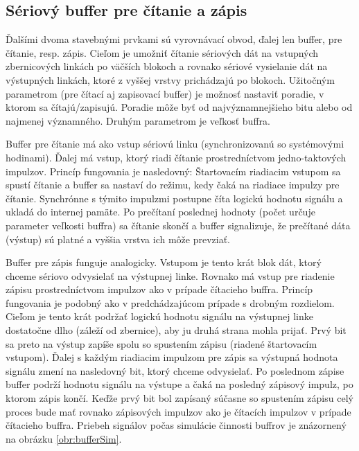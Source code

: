 \subsection{Sériový buffer pre čítanie a zápis}
Ďalšími dvoma stavebnými prvkami sú vyrovnávací obvod, ďalej len buffer, pre čítanie, resp. zápis. Cieľom je umožniť čítanie sériových dát na vstupných zbernicových linkách po väčších blokoch a rovnako sériové vysielanie dát na výstupných linkách, ktoré z vyššej vrstvy prichádzajú po blokoch. Užitočným parametrom (pre čítací aj zapisovací buffer) je možnosť nastaviť poradie, v ktorom sa čítajú/zapisujú. Poradie môže byť od najvýznamnejšieho bitu alebo od najmenej významného. Druhým parametrom je veľkosť buffra.

Buffer pre čítanie má ako vstup sériovú linku (synchronizovanú so systémovými hodinami). Ďalej má vstup, ktorý riadi čítanie prostredníctvom jedno-taktových impulzov. Princíp fungovania je nasledovný: Štartovacím riadiacim vstupom sa spustí čítanie a buffer sa nastaví do režimu, kedy čaká na riadiace impulzy pre čítanie. Synchrónne s týmito impulzmi postupne číta logickú hodnotu signálu a ukladá do internej pamäte. Po prečítaní poslednej hodnoty (počet určuje parameter veľkosti buffra) sa čítanie skončí a buffer signalizuje, že prečítané dáta (výstup) sú platné a vyššia vrstva ich môže prevziať.

Buffer pre zápis funguje analogicky. Vstupom je tento krát blok dát, ktorý chceme sériovo odvysielať na výstupnej linke. Rovnako má vstup pre riadenie zápisu prostredníctvom impulzov ako v prípade čítacieho buffra. Princíp fungovania je podobný ako v predchádzajúcom prípade s drobným rozdielom. Cieľom je tento krát podržať logickú hodnotu signálu na výstupnej linke dostatočne dlho (záleží od zbernice), aby ju druhá strana mohla prijať. Prvý bit sa preto na výstup zapíše spolu so spustením zápisu (riadené štartovacím vstupom). Ďalej s každým riadiacim impulzom pre zápis sa výstupná hodnota signálu zmení na nasledovný bit, ktorý chceme odvysielať. Po poslednom zápise buffer podrží hodnotu signálu na výstupe a čaká na posledný zápisový impulz, po ktorom zápis končí. Keďže prvý bit bol zapísaný súčasne so spustením zápisu celý proces bude mať rovnako zápisových impulzov ako je čítacích impulzov v prípade čítacieho buffra. Priebeh signálov počas simulácie činnosti buffrov je znázornený na obrázku \ref{obr:bufferSim}.

